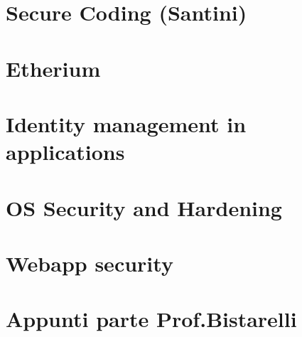 \documentclass[a4paper,12 pt]{report}
\theoremstyle{definition}
\theoremstyle{remark}
\begin{document}

\tableofcontents
\newpage

\newpage

\part{Secure Coding (Santini)}





\part{Etherium}

\part{Identity management in applications}


\part{OS Security and Hardening}


\part{Webapp security}

\part{Appunti parte Prof.Bistarelli}


\newpage

\end{document}

